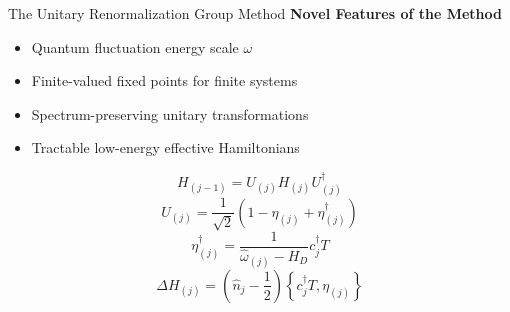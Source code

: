 \documentclass[aspectratio=169]{beamer}
\begin{document}
\begin{frame}[noframenumbering]{The Unitary Renormalization Group Method}
\centering
\vspace*{-20pt}
\large{\textbf{Novel Features of the Method}}

\vspace*{\fill}

\hspace*{-20pt}
\begin{minipage}{0.65\textwidth}
\begin{itemize}[<+-|alert@+>]
	\item Quantum fluctuation energy scale \(\omega\)
	\item Finite-valued fixed points for finite systems
	\item Spectrum-preserving unitary transformations
	\item Tractable low-energy effective Hamiltonians
\end{itemize}
\end{minipage}
\hspace*{\fill}
\begin{minipage}{0.3\textwidth}
	\[H_{(j-1)} = U_{(j)} H_{(j)} U_{(j)}^\dagger\]
	\[U_{(j)} = \frac{1}{\sqrt 2}\left(1 - \eta_{(j)} + \eta_{(j)}^\dagger\right) \]
	\[ \eta^\dagger_{(j)} = \frac{1}{\hat \omega_{(j)} - H_D}c^\dagger_j T\]
	\[ \Delta H_{(j)} = \left(\hat n_j - \frac{1}{2}\right) \left\{c^\dagger_j T, \eta_{(j)}\right\} \]
\end{minipage}
\end{frame}
\end{document}
